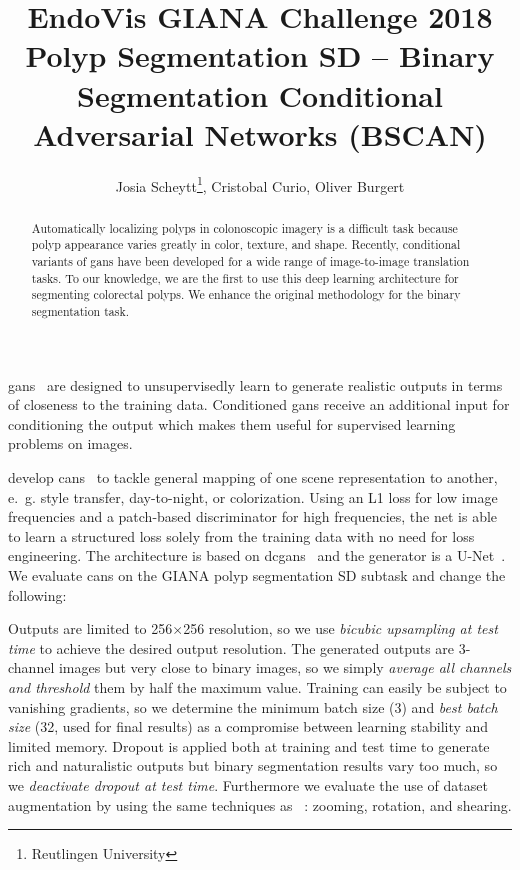 \documentclass[12pt]{article}
\title{EndoVis GIANA Challenge 2018 Polyp Segmentation SD -- Binary Segmentation Conditional Adversarial Networks (BSCAN)}
\author{Josia Scheytt\thanks{Reutlingen University}, Cristobal Curio\footnotemark[1], Oliver Burgert\footnotemark[1]}
\begin{document}
\maketitle

\begin{abstract}
Automatically localizing polyps in colonoscopic imagery is a difficult task because polyp appearance varies greatly in color, texture, and shape.
Recently, conditional variants of \glspl{gan} have been developed for a wide range of image-to-image translation tasks.
To our knowledge, we are the first to use this deep learning architecture for segmenting colorectal polyps.
We enhance the original methodology for the binary segmentation task.
\end{abstract}

\glspl{gan}~\cite{Goodfellow.2014} are designed to unsupervisedly learn to generate realistic outputs in terms of closeness to the training data.
Conditioned \glspl{gan} receive an additional input for conditioning the output which makes them useful for supervised learning problems on images.

\citeauthor{Isola.2017} develop \glspl{can}~\cite{Isola.2017} to tackle general mapping of one scene representation to another, e.~g. style transfer, day-to-night, or colorization.
Using an L1 loss for low image frequencies and a patch-based discriminator for high frequencies, the net is able to learn a structured loss solely from the training data with no need for loss engineering.
The architecture is based on \glspl{dcgan}~\cite{Radford.2016} and the generator is a U-Net~\cite{Ronneberger.2015}.
We evaluate \glspl{can} on the GIANA polyp segmentation SD subtask and change the following:

Outputs are limited to 256$\times$256 resolution, so we use \emph{bicubic upsampling at test time} to achieve the desired output resolution.
The generated outputs are 3-channel images but very close to binary images, so we simply \emph{average all channels and threshold} them by half the maximum value.
Training can easily be subject to vanishing gradients, so we determine the minimum batch size (3) and \emph{best batch size} (32, used for final results) as a compromise between learning stability and limited memory.
Dropout is applied both at training and test time to generate rich and naturalistic outputs but binary segmentation results vary too much, so we \emph{deactivate dropout at test time}.
Furthermore we evaluate the use of dataset augmentation by using the same techniques as \citeauthor{Vazquez.2017}~\cite{Vazquez.2017}: zooming, rotation, and shearing.

\printbibliography
\end{document}
